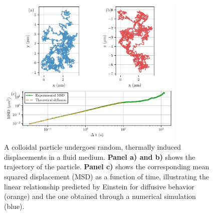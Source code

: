 

\begin{figure}[H]
  \begin{center}
    \includegraphics[width=0.8\textwidth]{figures/passivebrowniantrajectory.pdf}
  \end{center}
  \caption[Example of brownian motion]{A colloidal particle undergoes random, thermally induced displacements in a fluid medium. \textbf{Panel a) and b)} shows the trajectory of the particle. \textbf{ Panel c)} shows the corresponding mean squared displacement (MSD) as a function of time, illustrating the linear relationship predicted by Einstein for diffusive behavior (orange) and the one obtained through a numerical simulation (blue).}\label{fig:passivebrowniantrajectory}
\end{figure}



